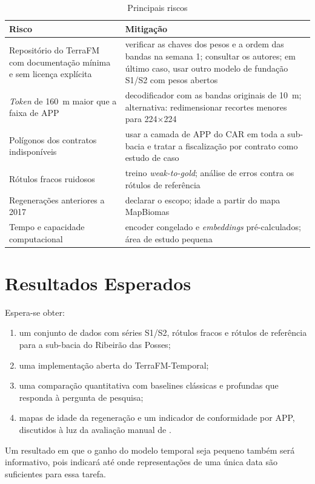 \documentclass[conference]{IEEEtran}
\begin{document}
\begin{table}[htbp]
\caption{Principais riscos}
\begin{center}
\footnotesize
\begin{tabular}{|p{3.0cm}|p{4.6cm}|}
\hline
\textbf{Risco} & \textbf{Mitigação} \\
\hline
Repositório do TerraFM com documentação mínima e sem licença explícita & verificar as chaves dos pesos e a ordem das bandas na semana 1; consultar os autores; em último caso, usar outro modelo de fundação S1/S2 com pesos abertos \\
\textit{Token} de 160~m maior que a faixa de APP & decodificador com as bandas originais de 10~m; alternativa: redimensionar recortes menores para 224$\times$224 \\
Polígonos dos contratos indisponíveis & usar a camada de APP do CAR em toda a sub-bacia e tratar a fiscalização por contrato como estudo de caso \\
Rótulos fracos ruidosos & treino \textit{weak-to-gold}; análise de erros contra os rótulos de referência \\
Regenerações anteriores a 2017 & declarar o escopo; idade a partir do mapa MapBiomas~\citep{silva2020} \\
Tempo e capacidade computacional & encoder congelado e \textit{embeddings} pré-calculados; área de estudo pequena \\
\hline
\end{tabular}
\label{tab:riscos}
\end{center}
\end{table}

\section{Resultados Esperados}\label{sec:esperados}

Espera-se obter:
\begin{enumerate}
\item um conjunto de dados com séries S1/S2, rótulos fracos e rótulos de referência para a sub-bacia do Ribeirão das Posses;
\item uma implementação aberta do TerraFM-Temporal;
\item uma comparação quantitativa com baselines clássicas e profundas que responda à pergunta de pesquisa;
\item mapas de idade da regeneração e um indicador de conformidade por APP, discutidos à luz da avaliação manual de \citet{ruggiero2019}.
\end{enumerate}
Um resultado em que o ganho do modelo temporal seja pequeno também será informativo, pois indicará até onde representações de uma única data são suficientes para essa tarefa.
\end{document}
